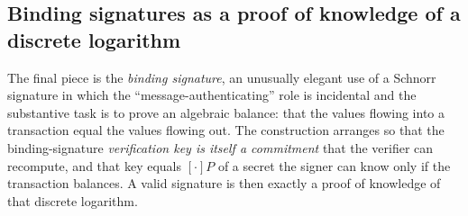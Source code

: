 \documentclass[11pt,a4paper]{article}
\theoremstyle{definition}
\theoremstyle{remark}
\begin{document}
\subsection{Binding signatures as a proof of knowledge of a discrete logarithm}\label{signatures:subsec:binding}

The final piece is the \emph{binding signature}, an unusually elegant use of a Schnorr signature in which the ``message-authenticating'' role is incidental and the substantive task is to prove an algebraic balance: that the values flowing into a transaction equal the values flowing out. The construction arranges so that the binding-signature \emph{verification key is itself a commitment} that the verifier can recompute, and that key equals \([{\cdot}]P\) of a secret the signer can know only if the transaction balances. A valid signature is then exactly a proof of knowledge of that discrete logarithm.
\end{document}
